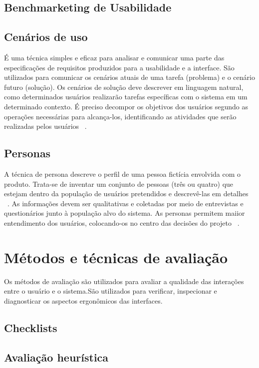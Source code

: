\subsection{Benchmarketing de Usabilidade}

\subsection{Cenários de uso}

	É uma técnica simples e eficaz para analisar e comunicar uma parte das especificações de requisitos produzidos para a usabilidade e a interface. São utilizados para comunicar os cenários atuais de uma tarefa (problema) e o cenário futuro (solução). Os cenários de solução deve descrever em linguagem natural, como determinados usuários realizarão tarefas específicas com o sistema em um determinado contexto. É preciso decompor os objetivos dos usuários segundo as operações necessárias para alcança-los, identificando as atividades que serão realizadas pelos usuários ~\cite{cybis2010}.

\subsection{Personas}

	A técnica de persona descreve o perfil de uma pessoa fictícia envolvida com o produto. Trata-se de inventar um conjunto de pessoas (três ou quatro) que estejam dentro da população de usuários pretendidos e descrevê-las em detalhes ~\cite{cybis2010}.
	As informações devem ser qualitativas e coletadas por meio de entrevistas e questionários junto à população alvo do sistema. As personas permitem maiior entendimento dos usuários, colocando-os no centro das decisões do projeto ~\cite{cybis2010}.


\section{Métodos e técnicas de avaliação}

	Os métodos de avaliação são utilizados para avaliar a qualidade das interações entre o usuário e o sistema.São utilizados para verificar, inspecionar e diagnosticar os aspectos ergonômicos das interfaces.

\subsection{Checklists}

\subsection{Avaliação heurística}

